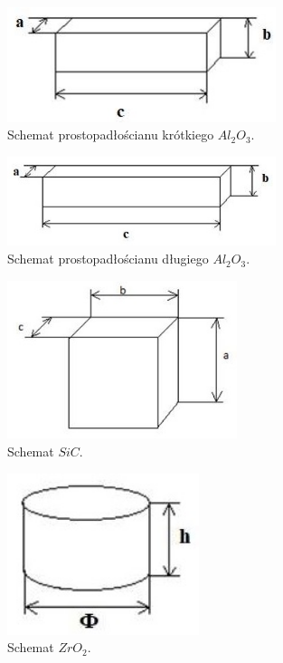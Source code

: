 \documentclass[a4paper,12pt]{article}
\begin{document}
\begin{figure}[H]
    \centering
    \includegraphics[width=0.7\textwidth]{img/krotkiAl2O3.jpg}
    \caption{Schemat prostopadłościanu krótkiego $Al_2O_3$.}
\end{figure}

\begin{figure}[H]
    \centering
    \includegraphics[width=0.7\textwidth]{img/dlugiAl2O3_stal.jpg}
    \caption{Schemat prostopadłościanu długiego $Al_2O_3$.}
\end{figure}

\begin{figure}[H]
    \centering
    \includegraphics[width=0.6\textwidth]{img/szescianAl2O3_SiC.jpg}
    \caption{Schemat $SiC$.}
\end{figure}

\begin{figure}[H]
    \centering
    \includegraphics[width=0.5\textwidth]{img/ZrO2.jpg}
    \caption{Schemat $ZrO_2$.}
\end{figure}
\end{document}
